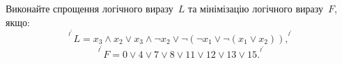 %
%
^^I^^IВиконайте спрощення логічного виразу~$L$ та мінімізацію логічного виразу~$F$, якщо:
^^I^^I\[
^^I^^I^^IL = x_3 \land x_2 \lor x_3 \land \neg{x_2} \lor \neg{(\neg{x_1} \lor \neg{ (x_1 \lor x_2) } )},
^^I^^I\]
^^I^^I\[
^^I^^I^^IF = 0 \lor 4 \lor 7 \lor 8 \lor 11 \lor 12 \lor 13 \lor 15.
^^I^^I\]

